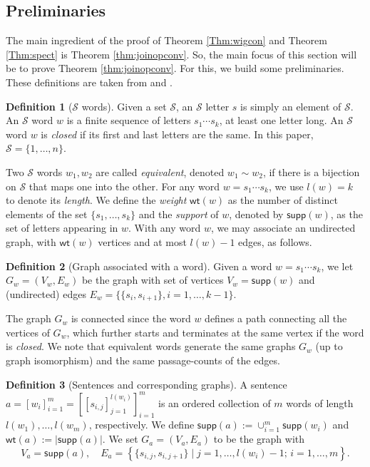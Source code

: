 \documentclass[reqno,12pt]{amsart}
\theoremstyle{plain}
\theoremstyle{definition}
\newtheorem{definition}{Definition}
\newcommand{\wt}{\mathsf{wt}}
\newcommand{\supp}{\mathsf{supp}}
\begin{document}
\subsection{Preliminaries}
The main ingredient of the proof of Theorem \ref{Thm:wigcon} and Theorem \ref{Thm:spect} is Theorem \ref{thm:joinopconv}. So, the main focus of this section will be to prove Theorem \ref{thm:joinopconv}. For this, we build some preliminaries. These definitions are taken from \cite{AGZ} and \cite{AZ05}.
\begin{definition}[$\mathcal{S}$ words]
Given a set $\mathcal{S}$, an $\mathcal{S}$ letter $s$ is simply an element of $\mathcal{S}$. An $\mathcal{S}$ word $w$ is a finite sequence of letters $s_1 \cdots s_k$, at least one letter long. An $\mathcal{S}$ word $w$ is \emph{closed} if its first and last letters are the same. In this paper, $\mathcal{S}=\{1,\ldots,n\}$.
\end{definition}
Two $\mathcal{S}$ words $w_1,w_2$ are called \emph{equivalent}, denoted $w_1\sim w_2$, if there is a bijection on $\mathcal{S}$ that maps one into the other. For any word $w = s_1 \cdots s_k$, we use $l(w) = k$ to denote its \emph{length}. We define the \emph{weight} $\wt(w)$ as the number of distinct elements of the set $\{s_1, \ldots, s_k \}$ and the \emph{support} of $w$, denoted by $\supp(w)$, as the set of letters appearing in $w$. With any word $w$, we may associate an undirected graph, with $\wt(w)$ vertices and at most $l(w) - 1$ edges, as follows.
\begin{definition}[Graph associated with a word]\label{def:graphword}
Given a word $w = s_1 \cdots s_k$, we let $G_w = (V_w, E_w)$ be the graph with set of vertices $V_w = \supp(w)$ and (undirected) edges $E_w = \{\{s_i, s_{i+1} \}, i = 1, \ldots, k - 1 \}.$
\end{definition}
The graph $G_w$ is connected since the word $w$ defines a path connecting all the
vertices of $G_w$, which further starts and terminates at the same vertex if the word
is \emph{closed}.  We note that equivalent words generate the same graphs $G_w$ (up to graph isomorphism) and the same passage-counts of the edges.
\begin{definition}[Sentences and corresponding graphs]\label{def:sentence}
A sentence $a = [w_i]_{i=1}^{m} = [[s_{i,j}]_{j = 1}^{l(w_i)}]_{i = 1}^{m}$ is an ordered collection of $m$ words of length $l(w_1), \ldots, l(w_m)$, respectively. We define $\supp(a) := \cup_{i = 1}^m \supp(w_i)$ and $\wt(a) := |\supp(a)|$. We set $G_a = (V_a, E_a)$ to be the graph with
\[
    V_a = \supp(a),\quad E_a = \left\{\{s_{i, j}, s_{i, j + 1}\} \mid j = 1, \ldots, l(w_i) - 1; \, i = 1,\ldots, m\right\}.
\]
\end{definition} 
\end{document}
